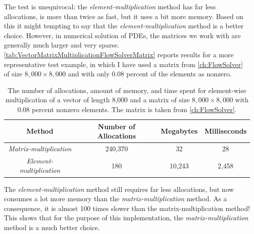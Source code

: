 The test is unequivocal:  the \textit{element-multiplication} method has far less allocations, is more than twice as fast, but it uses a bit more memory. Based on this it might tempting to say that the \textit{element-multiplication} method is a better choice. However, in numerical solution of PDEs, the matrices we work with are generally much larger and very sparse. \autoref{tab:VectorMatrixMultiplicationFlowSolverMatrix} reports results for a more representative test example, in which I have used a matrix from \autoref{ch:FlowSolver} of size $8,000\times 8,000$ and with only 0.08 percent of the elements as nonzero.
\begin{table}[H]
    \centering
    \caption{The number of allocations, amount of memory, and time spent for element-wise multiplication of a vector of length 8,000 and a matrix of size $8,000\times 8,000$ with 0.08 percent nonzero elements. The matrix is taken from \autoref{ch:FlowSolver}.}
    \label{tab:VectorMatrixMultiplicationFlowSolverMatrix}
    \def\arraystretch{1.5}
    \begin{tabular}{cccc}
    \textbf{Method} & \textbf{Number of Allocations} & \textbf{Megabytes} & \textbf{Milliseconds} \\
        \hline
         \textit{Matrix-multiplication} & 240,370 & 32 & 28 \\  
         \textit{Element-multiplication} & 180 & 10,243 & 2,458\\ 
         \hline
    \end{tabular}
\end{table}
The \textit{element-multiplication} method still requires far less allocations, but now consumes a lot more memory than the \textit{matrix-multiplication} method. As a consequence, it is almost 100 times slower than the matrix-multiplication method! This shows that for the purpose of this implementation, the \textit{matrix-multiplication} method is a much better choice.

